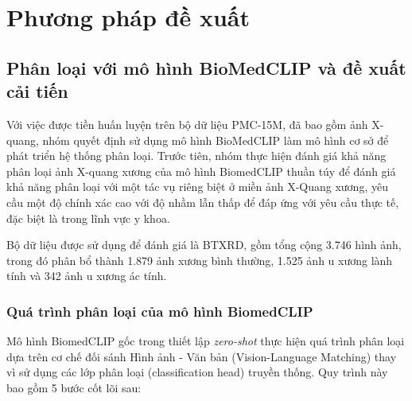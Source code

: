 \chapter{Phương pháp đề xuất}
\label{Chapter3}

\section{Phân loại với mô hình BioMedCLIP và đề xuất cải tiến}
Với việc được tiền huấn luyện trên bộ dữ liệu PMC-15M, đã bao gồm ảnh X-quang, nhóm quyết định sử dụng mô hình BioMedCLIP 
làm mô hình cơ sở để phát triển hệ thống phân loại. Trước tiên, nhóm thực hiện đánh giá khả năng phân loại ảnh 
X-quang xương của mô hình BiomedCLIP \cite{BiomedCLIP} thuần túy để đánh giá khả năng phân loại với một tác vụ riêng biệt
ở miền ảnh X-Quang xương, yêu cầu một độ chính xác cao với độ nhầm lẫn thấp để đáp ứng với yêu cầu thực tế, 
đặc biệt là trong lĩnh vực y khoa.

Bộ dữ liệu được sử dụng để đánh giá là BTXRD, gồm tổng cộng 3.746 hình ảnh, trong đó phân bổ 
thành 1.879 ảnh xương bình thường, 1.525 ảnh u xương lành tính và 342 ảnh u xương ác tính.

\subsection{Quá trình phân loại của mô hình BiomedCLIP}
Mô hình BiomedCLIP gốc trong thiết lập \textit{zero-shot} thực hiện quá trình phân loại dựa trên cơ chế đối sánh 
Hình ảnh - Văn bản (Vision-Language Matching) thay vì sử dụng các lớp phân loại (classification head) truyền thống. 
Quy trình này bao gồm 5 bước cốt lõi sau:

